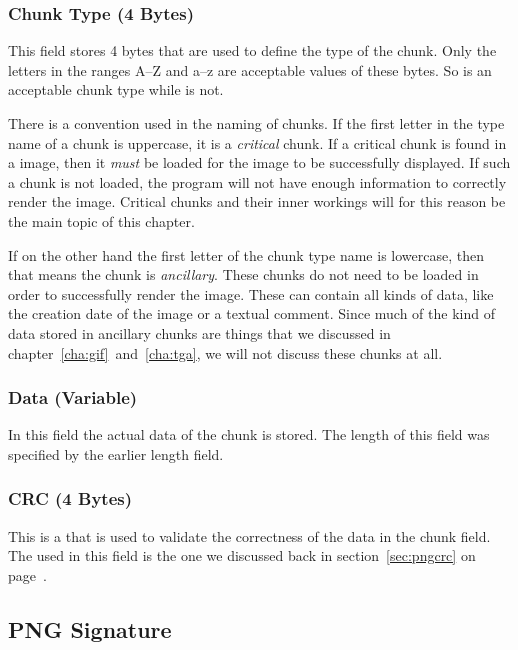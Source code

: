 \subsubsection*{Chunk Type (4 Bytes)}

This field stores 4 bytes that are used to define the type of the
chunk. Only the \ascii letters in the ranges A--Z and a--z are
acceptable values of these bytes. So  is an acceptable
chunk type while  is not.

There is a convention used in the naming of chunks. If the first
letter in the type name of a chunk is uppercase, it is a
\textit{critical} chunk. If a critical chunk is found in a \png image,
then it \textit{must} be loaded for the image to be successfully
displayed.  If such a chunk is not loaded, the program will not have
enough information to correctly render the image. Critical chunks and
their inner workings will for this reason be the main topic of this
chapter.

If on the other hand the first letter of the chunk type name is
lowercase, then that means the chunk is \textit{ancillary}. These
chunks do not need to be loaded in order to successfully render the
image. These can contain all kinds of data, like the creation date of
the image or a textual comment. Since much of the kind of data stored
in ancillary chunks are things that we discussed in
chapter~\ref{cha:gif}~and~\ref{cha:tga}, we will not discuss these
chunks at all.

\subsubsection*{Data (Variable)}

In this field the actual data of the chunk is stored. The length of
this field was specified by the earlier length field.

\subsubsection*{CRC (4 Bytes)}

This is a \crc that is used to validate the correctness of the data in
the chunk field. The \crc used in this field is the one we discussed
back in section~\ref{sec:pngcrc} on page~\pageref{sec:pngcrc}.

\subsection{PNG Signature}


